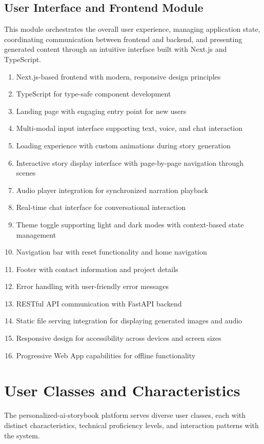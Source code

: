 \subsection{User Interface and Frontend Module}
This module orchestrates the overall user experience, managing application state, coordinating communication between frontend and backend, and presenting generated content through an intuitive interface built with Next.js \cite{nextjs2024} and TypeScript.
\begin{enumerate}
    \item Next.js-based frontend with modern, responsive design principles
    \item TypeScript for type-safe component development
    \item Landing page with engaging entry point for new users
    \item Multi-modal input interface supporting text, voice, and chat interaction
    \item Loading experience with custom animations during story generation
    \item Interactive story display interface with page-by-page navigation through scenes
    \item Audio player integration for synchronized narration playback
    \item Real-time chat interface for conversational interaction
    \item Theme toggle supporting light and dark modes with context-based state management
    \item Navigation bar with reset functionality and home navigation
    \item Footer with contact information and project details
    \item Error handling with user-friendly error messages
    \item RESTful API communication with FastAPI backend
    \item Static file serving integration for displaying generated images and audio
    \item Responsive design for accessibility across devices and screen sizes
    \item Progressive Web App capabilities for offline functionality
\end{enumerate}

\section{User Classes and Characteristics}
The personalized-ai-storybook platform serves diverse user classes, each with distinct characteristics, technical proficiency levels, and interaction patterns with the system.

